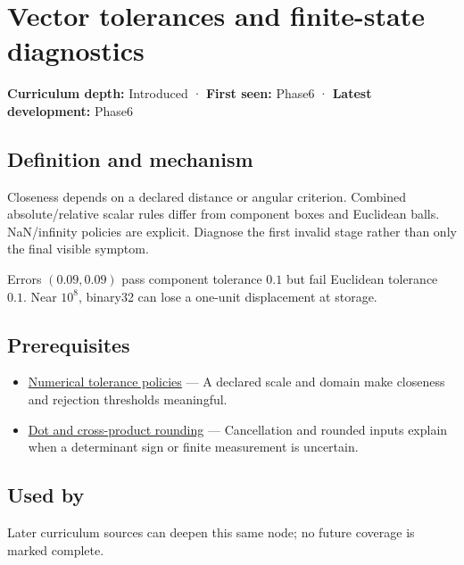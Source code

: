 \hypertarget{appendix-b5b83329215b}{}\label{referencestart:appendix-b5b83329215b}
\section{Vector tolerances and finite-state diagnostics}\label{appendix-b5b83329215b-vector-tolerances-and-finite-state-diagnostics}

\textbf{Curriculum depth:} Introduced · \textbf{First seen:} Phase6 · \textbf{Latest development:} Phase6

\subsection{Definition and mechanism}\label{appendix-b5b83329215b-definition-and-mechanism}

Closeness depends on a declared distance or angular criterion. Combined absolute/relative scalar rules differ from component boxes and Euclidean balls. NaN/infinity policies are explicit. Diagnose the first invalid stage rather than only the final visible symptom.

Errors \((0.09,0.09)\) pass component tolerance \(0.1\) but fail Euclidean tolerance \(0.1\). Near \(10^8\), binary32 can lose a one-unit displacement at storage.

\subsection{Prerequisites}\label{appendix-b5b83329215b-prerequisites}

\begin{itemize}
\tightlist
\item
  \hyperref[appendix-0ec599f8ba27]{Numerical tolerance policies} --- A declared scale and domain make closeness and rejection thresholds meaningful.
\item
  \hyperref[appendix-5aef4f13483a]{Dot and cross-product rounding} --- Cancellation and rounded inputs explain when a determinant sign or finite measurement is uncertain.
\end{itemize}

\subsection{Used by}\label{appendix-b5b83329215b-used-by}

Later curriculum sources can deepen this same node; no future coverage is marked complete.

